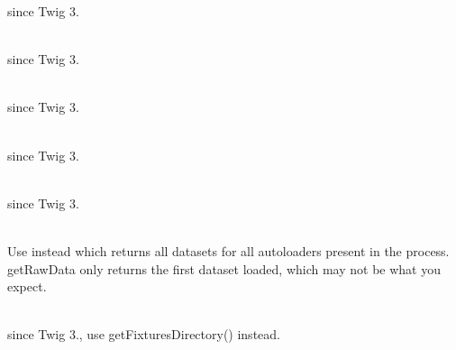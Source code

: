 \begin{DoxyRefList}
\label{deprecated__deprecated000016}%
%
since Twig 3.  
\item[{\parbox[t]{\linewidth}{Global(e) \doxylink{class_twig_1_1_expression_parser_af4649c23ab84785567030a0673a9ee76}{Expression\+Parser::\+parse\+Primary\+Expression} ()}}]\hfill \\
\label{deprecated__deprecated000010}%
%
since Twig 3.  
\item[{\parbox[t]{\linewidth}{Global(e) \doxylink{class_twig_1_1_expression_parser_ab0aadda3022fcd4afff8d7ce4d01bbfc}{Expression\+Parser::\+parse\+Sequence\+Expression} ()}}]\hfill \\
\label{deprecated__deprecated000013}%
%
since Twig 3.  
\item[{\parbox[t]{\linewidth}{Global(e) \doxylink{class_twig_1_1_expression_parser_a99a1301121a1b6e34fb7ce044baef1cf}{Expression\+Parser::\+parse\+String\+Expression} ()}}]\hfill \\
\label{deprecated__deprecated000011}%
%
since Twig 3.  
\item[{\parbox[t]{\linewidth}{Global(e) \doxylink{class_twig_1_1_expression_parser_a39de613eaf1404c8b0e3e676feaf5131}{Expression\+Parser::\+parse\+Subscript\+Expression} (\$node)}}]\hfill \\
\label{deprecated__deprecated000017}%
%
since Twig 3.  
\item[{\parbox[t]{\linewidth}{Global(e) \doxylink{class_composer_1_1_installed_versions_a6ecee8643c03c515b55686f03d117665}{Installed\+Versions::\+get\+Raw\+Data} ()}}]\hfill \\
\label{deprecated__deprecated000001}%
%
Use  instead which returns all datasets for all autoloaders present in the process. get\+Raw\+Data only returns the first dataset loaded, which may not be what you expect.  
\item[{\parbox[t]{\linewidth}{Global(e) \doxylink{class_twig_1_1_test_1_1_integration_test_case_a497128a4b6ea4dae7ab2be44290823aa}{Integration\+Test\+Case::\+get\+Fixtures\+Dir} ()}}]\hfill \\
\label{deprecated__deprecated000038}%
%
since Twig 3., use get\+Fixtures\+Directory() instead. 

\end{DoxyRefList}
